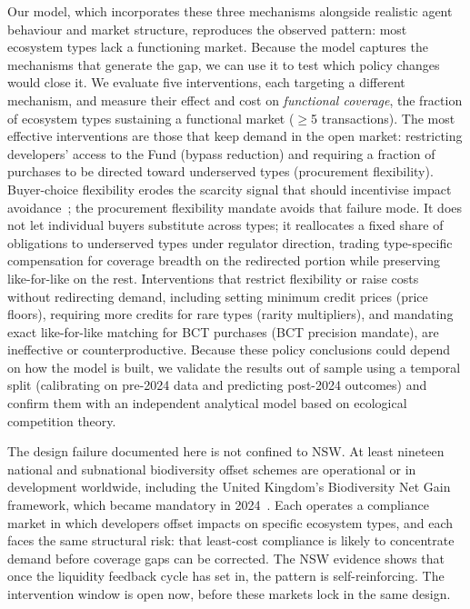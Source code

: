 \documentclass[pdflatex,sn-nature,oneside]{sn-jnl}
\begin{document}
Our model, which incorporates these three mechanisms alongside
realistic agent behaviour and market structure, reproduces the
observed pattern: most ecosystem types lack a functioning market.
Because the model captures the mechanisms that generate the gap, we can
use it to test which policy changes would close it.
We evaluate five interventions, each targeting a different mechanism,
and measure their effect and cost on \emph{functional coverage}, the
fraction of ecosystem types sustaining a functional market
($\geq$5 transactions).
The most effective interventions are those that keep demand in the open
market: restricting developers' access to the Fund (bypass
reduction) and requiring a fraction of purchases to be directed toward
underserved types (procurement flexibility).
Buyer-choice flexibility erodes the scarcity signal that should
incentivise impact avoidance~\cite{zuErmgassen2020}; the procurement
flexibility mandate avoids that failure mode. It does not let
individual buyers substitute across types; it reallocates a fixed
share of obligations to underserved types under regulator direction,
trading type-specific compensation for coverage breadth on the
redirected portion while preserving like-for-like on the rest.
Interventions that restrict flexibility or raise costs without redirecting
demand, including setting minimum credit prices (price floors),
requiring more credits for rare types (rarity multipliers), and
mandating exact like-for-like matching for BCT purchases
(BCT precision mandate), are ineffective or counterproductive.
Because these policy conclusions could depend on how the model is built,
we validate the results out of sample using a temporal split (calibrating
on pre-2024 data and predicting post-2024 outcomes) and confirm them with
an independent analytical model based on ecological competition theory.

The design failure documented here is not confined to NSW\@.
At least nineteen national and subnational biodiversity offset schemes are
operational or in development worldwide, including the United Kingdom's
Biodiversity Net Gain framework, which became mandatory in 2024~\cite{IAPB2024}.
Each operates a compliance market in which developers offset impacts on
specific ecosystem types, and each faces the same structural risk: that
least-cost compliance is likely to concentrate demand before coverage
gaps can be corrected.
The NSW evidence shows that once the liquidity feedback cycle has set in,
the pattern is self-reinforcing.
The intervention window is open now, before these markets lock in the same design.
\end{document}
